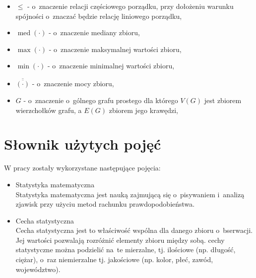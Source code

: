 \documentclass[12pt,a4paper]{report}
\newcommand{\mediana}{\operatorname{med}}
\newcommand{\licznosc}[1]{\overline{\overline{#1}}}
\begin{document}
\begin{itemize}
\item $\leq$ - o~znaczenie relacji częściowego porządku, przy dołożeniu warunku spójności o~znaczać będzie relację liniowego porządku,
\item $\mediana{(\cdot)}$ - o~znaczenie mediany zbioru,
\item $\max{(\cdot)}$ - o~znaczenie maksymalnej wartości zbioru,
\item $\min{(\cdot)}$ - o~znaczenie minimalnej wartości zbioru,
\item $\licznosc{(\cdot)}$ - o~znaczenie mocy zbioru,
\item $G$ - o~znaczenie o~gólnego grafu prostego dla którego $V(G)$ jest zbiorem wierzchołków grafu, a $E(G)$ zbiorem jego krawędzi,




\end{itemize}


\section{Słownik użytych pojęć}
W pracy zostały wykorzystane następujące pojęcia:
\begin{itemize}
\item Statystyka matematyczna \cite[w o~parciu o~ rozdział 1]{krysicki1999}\\
Statystyka matematyczna jest nauką zajmującą się o~pisywaniem i~analizą zjawisk przy użyciu metod rachunku prawdopodobieństwa. 


 
 
\item Cecha statystyczna \cite[Rozdział 1]{krysicki1999}\\
Cecha statystyczna jest to właściwość wspólna dla danego zbioru o~bserwacji. Jej wartości pozwalają rozróżnić elementy zbioru między sobą. cechy statystyczne można podzielić na~te mierzalne, tj. ilościowe (np. długość, ciężar), o~raz niemierzalne tj. jakościowe (np. kolor, płeć, zawód, województwo).

\end{itemize}
\end{document}
